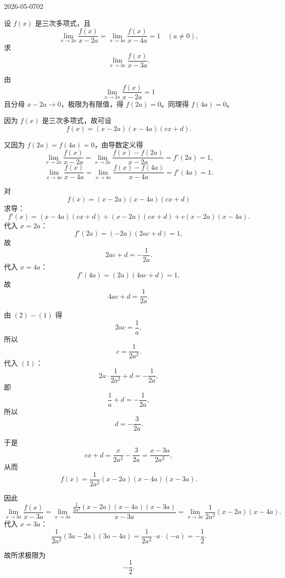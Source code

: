 \begin{mistake}{2026-05-07}{02}

\begin{problemcontent}
设 \(f(x)\) 是三次多项式，且
\[
\lim_{x\to 2a}\frac{f(x)}{x-2a}=\lim_{x\to 4a}\frac{f(x)}{x-4a}=1\quad (a\ne 0),
\]
求
\[
\lim_{x\to 3a}\frac{f(x)}{x-3a}.
\]
\end{problemcontent}

\begin{solutioncontent}
由
\[
\lim_{x\to 2a}\frac{f(x)}{x-2a}=1
\]
且分母 \(x-2a\to 0\)，极限为有限值，得 \(f(2a)=0\)。同理得 \(f(4a)=0\)。

因为 \(f(x)\) 是三次多项式，故可设
\[
f(x)=(x-2a)(x-4a)(cx+d).
\]

又因为 \(f(2a)=f(4a)=0\)，由导数定义得
\[
\lim_{x\to 2a}\frac{f(x)}{x-2a}
=\lim_{x\to 2a}\frac{f(x)-f(2a)}{x-2a}=f'(2a)=1,
\]
\[
\lim_{x\to 4a}\frac{f(x)}{x-4a}
=\lim_{x\to 4a}\frac{f(x)-f(4a)}{x-4a}=f'(4a)=1.
\]

对
\[
f(x)=(x-2a)(x-4a)(cx+d)
\]
求导：
\[
f'(x)=(x-4a)(cx+d)+(x-2a)(cx+d)+c(x-2a)(x-4a).
\]
代入 \(x=2a\)：
\[
f'(2a)=(-2a)(2ac+d)=1,
\]
故
\[
2ac+d=-\frac{1}{2a}. \tag{1}
\]
代入 \(x=4a\)：
\[
f'(4a)=(2a)(4ac+d)=1,
\]
故
\[
4ac+d=\frac{1}{2a}. \tag{2}
\]

由 \((2)-(1)\) 得
\[
2ac=\frac{1}{a},
\]
所以
\[
c=\frac{1}{2a^2}.
\]
代入 \((1)\)：
\[
2a\cdot \frac{1}{2a^2}+d=-\frac{1}{2a},
\]
即
\[
\frac{1}{a}+d=-\frac{1}{2a},
\]
所以
\[
d=-\frac{3}{2a}.
\]

于是
\[
cx+d=\frac{x}{2a^2}-\frac{3}{2a}=\frac{x-3a}{2a^2},
\]
从而
\[
f(x)=\frac{1}{2a^2}(x-2a)(x-4a)(x-3a).
\]

因此
\[
\lim_{x\to 3a}\frac{f(x)}{x-3a}
=\lim_{x\to 3a}\frac{\frac{1}{2a^2}(x-2a)(x-4a)(x-3a)}{x-3a}
=\lim_{x\to 3a}\frac{1}{2a^2}(x-2a)(x-4a).
\]
代入 \(x=3a\)：
\[
\frac{1}{2a^2}(3a-2a)(3a-4a)
=\frac{1}{2a^2}\cdot a\cdot (-a)
=-\frac12.
\]

故所求极限为
\[
\boxed{-\frac12}.
\]
\end{solutioncontent}


\end{mistake}
